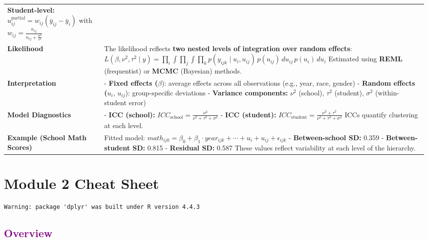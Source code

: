 \documentclass[
  letterpaper,
  DIV=11,
  numbers=noendperiod]{scrreprt}
\begin{document}
\begin{longtable}[]{@{}
  >{\raggedright\arraybackslash}p{}
  >{\raggedright\arraybackslash}p{}@{}}
\textbf{Student-level:}
\(\hat{u}_{ij}^{\text{partial}} = w_{ij} (\bar{y}_{ij} - \bar{y}_i)\)
with \(w_{ij} = \frac{n_{ij}}{n_{ij} + \frac{\sigma^2}{\tau^2}}\) \\
\textbf{Likelihood} & The likelihood reflects \textbf{two nested levels
of integration over random effects}:
\(L(\beta, \nu^2, \tau^2 \mid y) = \prod_i \int \prod_j \int \prod_k p(y_{ijk} \mid u_i, u_{ij}) \, p(u_{ij}) \, du_{ij} \, p(u_i) \, du_i\)
Estimated using \textbf{REML} (frequentist) or \textbf{MCMC} (Bayesian)
methods. \\
\textbf{Interpretation} & - \textbf{Fixed effects (}\(\beta\)): average
effects across all observations (e.g., year, race, gender) -
\textbf{Random effects (}\(u_i\), \(u_{ij}\)): group-specific deviations
- \textbf{Variance components:} \(\nu^2\) (school), \(\tau^2\)
(student), \(\sigma^2\) (within-student error) \\
\textbf{Model Diagnostics} & - \textbf{ICC (school):}
\(ICC_{\text{school}} = \frac{\nu^2}{\nu^2 + \tau^2 + \sigma^2}\) -
\textbf{ICC (student):}
\(ICC_{\text{student}} = \frac{\nu^2 + \tau^2}{\nu^2 + \tau^2 + \sigma^2}\)
ICCs quantify clustering at each level. \\
\textbf{Example (School Math Scores)} & Fitted model:
\(math_{ijk} = \beta_0 + \beta_1 \cdot year_{ijk} + \cdots + u_i + u_{ij} + \epsilon_{ijk}\)
- \textbf{Between-school SD:} 0.359 - \textbf{Between-student SD:} 0.815
- \textbf{Residual SD:} 0.587 These values reflect variability at each
level of the hierarchy. \\
\end{longtable}


\hypertarget{module-2-cheat-sheet}{%
\chapter*{Module 2 Cheat Sheet}\label{module-2-cheat-sheet}}


\begin{verbatim}
Warning: package 'dplyr' was built under R version 4.4.3
\end{verbatim}

\hypertarget{section-11}{%
\section*{\texorpdfstring{\textcolor{purple}{Overview}}{}}\label{section-11}}
\end{document}
